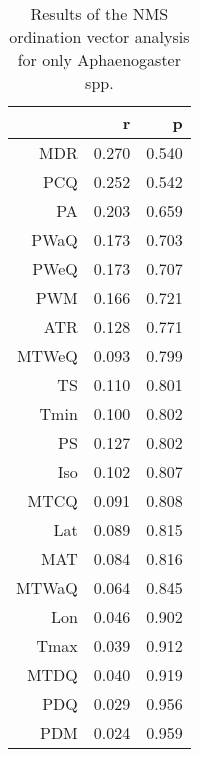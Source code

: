 \begin{table}[ht]
\centering
\begin{tabular}{rrr}
  \hline
 & r & p \\ 
  \hline
MDR & 0.270 & 0.540 \\ 
  PCQ & 0.252 & 0.542 \\ 
  PA & 0.203 & 0.659 \\ 
  PWaQ & 0.173 & 0.703 \\ 
  PWeQ & 0.173 & 0.707 \\ 
  PWM & 0.166 & 0.721 \\ 
  ATR & 0.128 & 0.771 \\ 
  MTWeQ & 0.093 & 0.799 \\ 
  TS & 0.110 & 0.801 \\ 
  Tmin & 0.100 & 0.802 \\ 
  PS & 0.127 & 0.802 \\ 
  Iso & 0.102 & 0.807 \\ 
  MTCQ & 0.091 & 0.808 \\ 
  Lat & 0.089 & 0.815 \\ 
  MAT & 0.084 & 0.816 \\ 
  MTWaQ & 0.064 & 0.845 \\ 
  Lon & 0.046 & 0.902 \\ 
  Tmax & 0.039 & 0.912 \\ 
  MTDQ & 0.040 & 0.919 \\ 
  PDQ & 0.029 & 0.956 \\ 
  PDM & 0.024 & 0.959 \\ 
   \hline
\end{tabular}
\caption{Results of the NMS ordination vector analysis for only Aphaenogaster spp.} 
\end{table}

